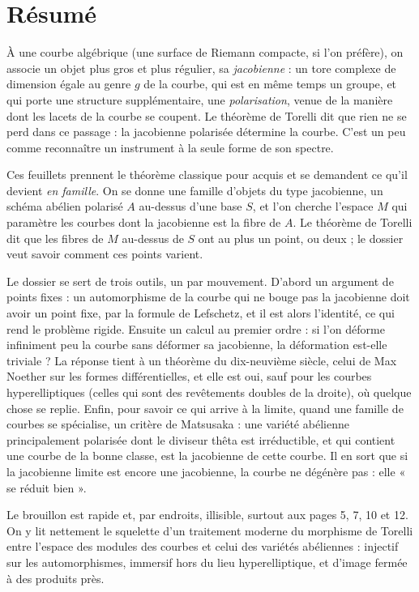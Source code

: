 \documentclass[11pt,a4paper]{article}
\begin{document}
\section*{Résumé}

\begin{resume}
À une courbe algébrique (une surface de Riemann compacte, si l'on préfère),
on associe un objet plus gros et plus régulier, sa \emph{jacobienne} : un
tore complexe de dimension égale au genre $g$ de la courbe, qui est en même
temps un groupe, et qui porte une structure supplémentaire, une
\emph{polarisation}, venue de la manière dont les lacets de la courbe se coupent. Le théorème de Torelli dit que rien ne se perd dans ce
passage : la jacobienne polarisée détermine la courbe. C'est un peu comme
reconnaître un instrument à la seule forme de son spectre.

Ces feuillets prennent le théorème classique pour acquis et se demandent ce
qu'il devient \emph{en famille}. On se donne une famille d'objets du type
jacobienne, un schéma abélien polarisé $A$ au-dessus d'une base $S$, et
l'on cherche l'espace $M$ qui paramètre les courbes dont la jacobienne est la
fibre de $A$. Le théorème de Torelli dit que les fibres de $M$ au-dessus de $S$
ont au plus un point, ou deux ; le dossier veut savoir comment ces points
varient.

Le dossier se sert de trois outils, un par mouvement. D'abord un argument de points fixes : un
automorphisme de la courbe qui ne bouge pas la jacobienne doit avoir un point
fixe, par la formule de Lefschetz, et il est alors l'identité, ce qui
rend le problème rigide. Ensuite un calcul au premier ordre : si l'on déforme
infiniment peu la courbe sans déformer sa jacobienne, la déformation est-elle
triviale ? La réponse tient à un théorème du dix-neuvième siècle, celui de Max
Noether sur les formes différentielles, et elle est oui, sauf pour les
courbes hyperelliptiques (celles qui sont des revêtements doubles de la
droite), où quelque chose se replie. Enfin, pour savoir ce qui arrive à la
limite, quand une famille de courbes se spécialise, un critère de Matsusaka :
une variété abélienne principalement polarisée dont le diviseur thêta est
irréductible, et qui contient une courbe de la bonne classe, est la jacobienne
de cette courbe. Il en sort que si la jacobienne limite est encore une
jacobienne, la courbe ne dégénère pas : elle « se réduit bien ».

Le brouillon est rapide et, par endroits, illisible, surtout aux pages 5, 7,
10 et 12. On y lit nettement le squelette d'un traitement moderne du
morphisme de Torelli entre l'espace des modules des courbes et celui des
variétés abéliennes : injectif sur les automorphismes, immersif hors du lieu
hyperelliptique, et d'image fermée à des produits près.

\end{resume}
\end{document}

